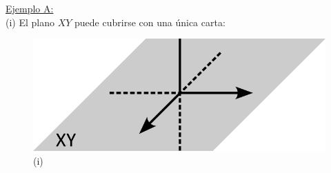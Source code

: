 \begin{mybox}
    \underline{Ejemplo A:} \\
        (i) El plano $XY$ puede cubrirse con una única carta:
        
        \begin{figure}
            \centering
            \includegraphics[scale=.2]{FOTOS/ejemplo2_A.png}
            \caption*{(i)}
        \end{figure}
        

\end{mybox}
